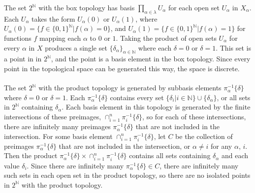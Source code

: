 \documentclass{article}
\begin{document}
The set $2^{\mathbb{N}}$ with the box topology has basis $\prod_{\alpha \in \lambda}U_\alpha$ for each open set $U_\alpha$ in $X_\alpha$.  
Each $U_\alpha$ takes the form $U_\alpha(0)$ or $U_\alpha(1)$, where $U_\alpha(0) = \{ f \in \{0,1\}^{\mathbb{N}}| f(\alpha) = 0 \}$, 
and $U_\alpha(1) = \{ f \in \{0,1\}^{\mathbb{N}}| f(\alpha) = 1 \}$ for functions $f$ mapping each $\alpha$ to $0$ or $1$.  
Taking the product of open sets $U_\alpha$ for every $\alpha$ in $X$ produces a single set $\{\delta_\alpha\}_{\alpha \in \mathbb{N}}$ where each
$\delta = 0$ or $\delta = 1$.  This set is a point in in $2^{\mathbb{N}}$, and the point is a basis element in the box topology.  
Since every point in the topological space can be generated this way, the space is discrete. \\ 
\\ 
The set $2^{\mathbb{N}}$ with the product topology is generated by subbasis elements $\pi^{-1}_\alpha \{\delta\}$ where $\delta = 0$ 
or $\delta = 1$.  Each $\pi^{-1}_\alpha \{\delta\}$ contains every set $\{\delta_i | i \in \mathbb{N}\} \cup \{\delta_\alpha\}$, or 
all sets in $2^{\mathbb{N}}$ containing $\delta_\alpha$.  Each basis element in this topology is generated by the finite intersections 
of these preimages, $\cap_{i = 1}^n \pi^{-1}_i \{\delta\}$, so for each of these intersections, there are infinitely many preimages 
$\pi^{-1}_\alpha \{\delta\}$ that are not included in the intersection.  For some basis element $\cap_{i = 1}^n \pi^{-1}_i \{\delta\}$, 
let $C$ be the collection of preimages $\pi^{-1}_\alpha \{\delta\}$ that are not included in the intersection, or $\alpha \neq i$ 
for any $\alpha$, $i$.  Then the product $\pi^{-1}_\alpha \{\delta\} \times \cap_{i = 1}^n \pi^{-1}_i \{\delta\}$ contains all sets 
containing $\delta_\alpha$ and each value $\delta_i$.  Since there are infinitely many $\pi^{-1}_\alpha \{\delta\} \in C$, 
there are infinitely many such sets in each open set in the product topology, so there are no isolated points in $2^\mathbb{N}$ 
with the product topology.
\end{document}
